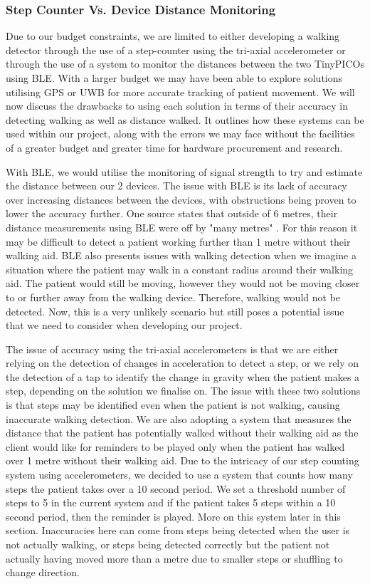 {\subsubsection{Step Counter Vs. Device Distance Monitoring}

Due to our budget constraints, we are limited to either developing a walking detector through the use of a step-counter using the tri-axial accelerometer or through the use of a system to monitor the distances between the two TinyPICOs using BLE. With a larger budget we may have been able to explore solutions utilising GPS or UWB for more accurate tracking of patient movement. We will now discuss the drawbacks to using each solution in terms of their accuracy in detecting walking as well as distance walked. It outlines how these systems can be used within our project, along with the errors we may face without the facilities of a greater budget and greater time for hardware procurement and research.

With BLE, we would utilise the monitoring of signal strength to try and estimate the distance between our 2 devices. The issue with BLE is its lack of accuracy over increasing distances between the devices, with obstructions being proven to lower the accuracy further. One source states that outside of 6 metres, their distance measurements using BLE were off by "many metres" \cite{locatify_2020}. For this reason it may be difficult to detect a patient working further than 1 metre without their walking aid. BLE also presents issues with walking detection when we imagine a situation where the patient may walk in a constant radius around their walking aid. The patient would still be moving, however they would not be moving closer to or further away from the walking device. Therefore, walking would not be detected. Now, this is a very unlikely scenario but still poses a potential issue that we need to consider when developing our project.

The issue of accuracy using the tri-axial accelerometers is that we are either relying on the detection of changes in acceleration to detect a step, or we rely on the detection of a tap to identify the change in gravity when the patient makes a step, depending on the solution we finalise on. The issue with these two solutions is that steps may be identified even when the patient is not walking, causing inaccurate walking detection. We are also adopting a system that measures the distance that the patient has potentially walked without their walking aid as the client would like for reminders to be played only when the patient has walked over 1 metre without their walking aid. Due to the intricacy of our step counting system using accelerometers, we decided to use a system that counts how many steps the patient takes over a 10 second period. We set a threshold number of steps to 5 in the current system and if the patient takes 5 steps within a 10 second period, then the reminder is played. More on this system later in this section. Inaccuracies here can come from steps being detected when the user is not actually walking, or steps being detected correctly but the patient not actually having moved more than a metre due to smaller steps or shuffling to change direction.

}
